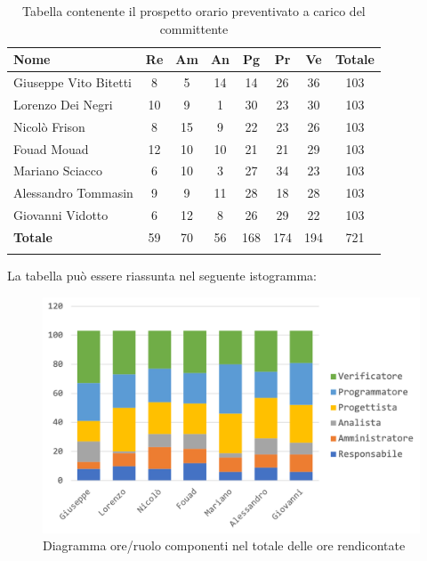 				\begin{longtable}{|l|c|c|c|c|c|c|c|}
					\hline
					\rowcolor{lighter-grayer}
					\textbf{Nome} & \textbf{Re} & \textbf{Am} & \textbf{An} & \textbf{Pg}  & \textbf{Pr}   & \textbf{Ve} & \textbf{Totale} \\
					\hline
					\endfirsthead
					
					\hline
					Giuseppe Vito Bitetti 		& 8 & 5 & 14 & 14 & 26 & 36 & 103\\
					\hline
					\hline
					Lorenzo Dei Negri			& 10 & 9 & 1 & 30 & 23 & 30 & 103\\
					\hline
					\hline
					Nicolò Frison				    & 8 & 15 & 9 & 22 & 23 & 26 & 103\\
					\hline
					\hline
					Fouad Mouad 				 & 12 & 10 & 10 & 21 & 21 & 29 & 103\\
					\hline
					\hline
					Mariano Sciacco 			& 6 & 10 & 3 & 27 & 34 & 23 & 103\\
					\hline
					\hline
					Alessandro Tommasin    & 9 & 9 & 11 & 28 & 18 & 28 & 103\\
					\hline
					\hline
					Giovanni Vidotto 			 & 6 & 12 & 8 & 26 & 29 & 22 & 103\\
					\hline 
					\textbf{Totale}				 & 59 &  70 & 56 & 168 & 174 & 194 & 721\\
					\hline
					\caption{Tabella contenente il prospetto orario preventivato a carico del committente}
				\end{longtable}
				
				La tabella può essere riassunta nel seguente istogramma:
				\begin{figure}[H]
					\centering
					\includegraphics[width=0.8\linewidth]{./images/preventivo/totOreRed1.png}
					\caption{Diagramma ore/ruolo componenti nel totale delle ore rendicontate}
					\label{fig:diagramma suddivione ruoli totale ore rendicontete}
				\end{figure}
				\pagebreak
			
